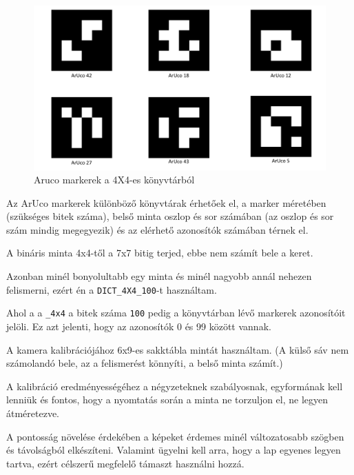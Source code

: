 \begin{figure}[htp]
    \centering
   	\includegraphics[width=4.8truecm, height=3truecm]{images/kep.png}
	\caption{Aruco markerek a 4X4-es könyvtárból}
\end{figure}


Az ArUco markerek különböző könyvtárak érhetőek el, a marker méretében (szükséges bitek száma), belső minta oszlop és sor számában (az oszlop és sor szám mindig megegyezik) és az elérhető azonosítók számában térnek el.


A bináris minta 4x4-től a 7x7 bitig terjed, ebbe nem számít bele a keret.

Azonban minél bonyolultabb egy minta és minél nagyobb annál nehezen felismerni, ezért én a  \texttt{DICT\_4X4\_100}-t használtam.

Ahol a a \texttt{\_4x4} a bitek száma \texttt{100} pedig a könyvtárban lévő markerek azonosítóit jelöli.
Ez azt jelenti, hogy az azonosítók  0 és 99 között vannak.



A kamera kalibrációjához 6x9-es sakktábla mintát használtam. (A külső sáv nem számolandó bele, az a felismerést könnyíti, a belső minta számít.) 

A kalibráció eredményességéhez a négyzeteknek szabályosnak, egyformának kell lenniük és fontos, hogy a nyomtatás során a minta ne torzuljon el, ne legyen átméretezve. 

A pontosság növelése érdekében a képeket érdemes minél változatosabb szögben és távolságból elkészíteni. Valamint ügyelni kell arra, hogy a lap egyenes legyen tartva, ezért célszerű megfelelő támaszt használni hozzá.


